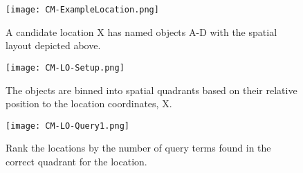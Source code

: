 \begin{figure*}[t]
    \centering
    \begin{subfigure}[t]{.25\textwidth}
        \texttt{[image: CM-ExampleLocation.png]}
        \caption{\small A candidate location X has named objects A-D with the spatial layout depicted above.} 
        \label{fig:CM-LO-Example}
    \end{subfigure}
    \hfill
    \begin{subfigure}[t]{.25\textwidth}
        \texttt{[image: CM-LO-Setup.png]}
        \caption{\small The objects are binned into spatial quadrants based on their relative position to the location coordinates, X.} 
        \label{fig:CM-LO-Setup}
    \end{subfigure}
    \hfill
        \begin{subfigure}[t]{.25\textwidth}
        \texttt{[image: CM-LO-Query1.png]}
        \caption{\small Rank the locations by the number of query terms found in the correct quadrant for the location.}
        \label{fig:CM-LO-Query}
    \hfill
    \end{subfigure}
    \caption{\textbf{Location-Object Search Method. A Location-Object data structure (Figure \ref{fig:CM-LO-Setup}) is generated based on the cardinal relations between the objects and the location (Figure \ref{fig:CM-LO-Example}). Then a pictorial query is matched against the structure (Figure \ref{fig:CM-LO-Query}).}}\label{figure:ConceptMap-LO} 
\end{figure*}





